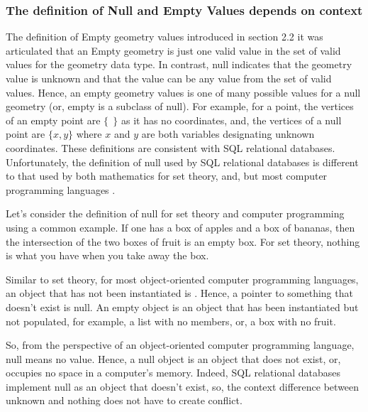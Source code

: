 \documentclass[letterpaper,10pt,english]{sphinxmanual}
\begin{document}
\subsubsection{The definition of Null and Empty Values depends on context}
\label{\detokenize{concept:the-definition-of-null-and-empty-values-depends-on-context}}
The definition of Empty geometry values introduced in section 2.2 it was articulated that an Empty geometry is just one valid value in the set of valid values for the geometry data type.  In contrast, null indicates that the geometry value is unknown and that the value can be any value from the set of valid values. Hence, an empty geometry values is one of many possible values for a null geometry (or, empty is a subclass of null).  For example, for a point, the vertices of an empty point are \(\{\ \ \}\) as it has no coordinates, and, the vertices of a null point are \(\{x,y\}\) where \(x\) and \(y\) are both variables designating unknown coordinates. These definitions are consistent with SQL relational databases.  Unfortunately, the definition of null used by SQL relational databases is different to that used by both mathematics for set theory, and, but most computer programming languages .

Let’s consider the definition of null for set theory and computer programming using a common example.  If one has a box of apples and a box of bananas, then the intersection of the two boxes of fruit is an empty box. For set theory,  \textendash{} nothing is what you have when you take away the box.

Similar to set theory, for most object-oriented computer programming languages, an object that has not been instantiated is .  Hence, a pointer to something that doesn’t exist is null. An empty object is an object that has been instantiated but not populated, for example, a list with no members, or, a box with no fruit.

So, from the perspective of an object-oriented computer programming language, null means no value.  Hence, a null object is an object that does not exist, or, occupies no space in a computer’s memory.  Indeed, SQL relational databases implement null as an object that doesn’t exist, so, the context difference between unknown and nothing does not have to create conflict.
\end{document}
